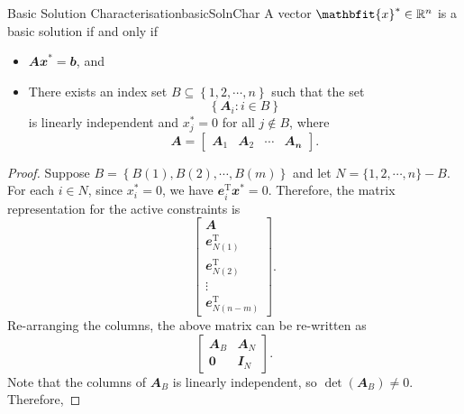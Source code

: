 \documentclass[math, code]{amznotes}
\theoremstyle{remark}
\begin{document}
\begin{thmbox}{Basic Solution Characterisation}{basicSolnChar}
    A vector $\mathbfit{x}^* \in \R^n$ is a basic solution if and only if
    \begin{itemize}
        \item $\mathbfit{Ax}^* = \mathbfit{b}$, and
        \item There exists an index set $B \subseteq \left\{1, 2, \cdots, n\right\}$ such that the set
        \begin{equation*}
            \left\{\mathbfit{A}_i \colon i \in B\right\}
        \end{equation*}
        is linearly independent and $x^*_j = 0$ for all $j \notin B$, where
        \begin{equation*}
            \mathbfit{A} = \begin{bmatrix}
                \mathbfit{A_1} & \mathbfit{A_2} & \cdots & \mathbfit{A_n}
            \end{bmatrix}.
        \end{equation*}
    \end{itemize}
    \tcblower
    \begin{proof}
        Suppose $B = \left\{B(1), B(2), \cdots, B(m)\right\}$ and let $N = \{1, 2, \cdots, n\} - B$. For each $i \in N$, since $x^*_i = 0$, we have $\mathbfit{e}^{\mathrm{T}}_i\mathbfit{x}^* = 0$. Therefore, the matrix representation for the active constraints is
        \begin{equation*}
            \begin{bmatrix}
                \mathbfit{A} \\
                \mathbfit{e}^{\mathrm{T}}_{N(1)} \\
                \mathbfit{e}^{\mathrm{T}}_{N(2)} \\
                \vdots \\
                \mathbfit{e}^{\mathrm{T}}_{N(n - m)}
            \end{bmatrix}.
        \end{equation*}
        Re-arranging the columns, the above matrix can be re-written as
        \begin{equation*}
            \begin{bmatrix}
                \mathbfit{A}_B & \mathbfit{A}_N \\
                \mathbf{0} & \mathbfit{I}_N
            \end{bmatrix}.
        \end{equation*}
        Note that the columns of $\mathbfit{A}_B$ is linearly independent, so $\det(\mathbfit{A}_B) \neq 0$. Therefore, 

\end{proof}
\end{thmbox}
\end{document}
